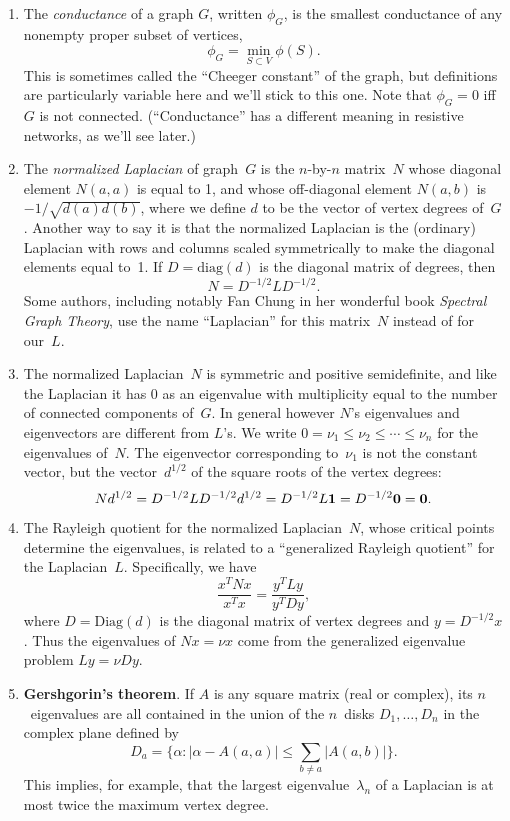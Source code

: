 \documentclass[11pt]{article}
\newcommand{\m}[1]{{\bf{#1}}}       %
\newcommand{\ones}{\m1}             %
\newcommand{\zeros}{\m0}            %
\newcommand{\diag}{\mbox{diag}}
\newcommand{\Diag}{\mbox{Diag}}
\begin{document}
\begin{enumerate}
\item
The {\em conductance} of a graph $G$,
written $\phi_G$, is the smallest conductance of any nonempty 
proper subset of vertices,
$$\phi_G = \min_{S\subset V}\phi(S).$$
This is sometimes called the ``Cheeger constant''
of the graph, but definitions are particularly
variable here and we'll stick to this one.
Note that $\phi_G=0$ iff $G$ is not connected.
(``Conductance'' has a different meaning in resistive networks, as we'll see later.)

\item\label{nlap}
The {\em normalized Laplacian} of graph~$G$ is 
the $n$-by-$n$ matrix~$N$
whose diagonal element $N(a,a)$ is equal to 1,
and whose off-diagonal element $N(a,b)$ 
is~$-1/\sqrt{d(a)d(b)}$, 
where we define $d$ to be the vector of vertex degrees of~$G$.
Another way to say it is that the normalized Laplacian is 
the (ordinary) Laplacian with rows and columns scaled symmetrically 
to make the diagonal elements equal to~1. 
If $D=\diag(d)$ is the diagonal matrix of degrees, 
then 
$$N = D^{-1/2}LD^{-1/2}.$$
Some authors, including notably Fan Chung in her 
wonderful book {\em Spectral Graph Theory}, 
use the name ``Laplacian'' for this matrix~$N$
instead of for our~$L$.

\item\label{nlapeig}
The normalized Laplacian~$N$ is symmetric and 
positive semidefinite, and like the Laplacian
it has 0 as an eigenvalue with multiplicity
equal to the number of connected components
of~$G$.  In general however $N$'s eigenvalues
and eigenvectors are different from $L$'s.
We write $0=\nu_1\le\nu_2\le\cdots\le\nu_n$
for the eigenvalues of~$N$.
The eigenvector corresponding to~$\nu_1$ is
not the constant vector, but the vector~$d^{1/2}$
of the square roots of the vertex degrees:
$$Nd^{1/2} = D^{-1/2}LD^{-1/2}d^{1/2} = D^{-1/2}L\ones = D^{-1/2}\zeros = \zeros.$$

\item\label{nlaprq}
The Rayleigh quotient for the normalized Laplacian~$N$, 
whose critical points determine the eigenvalues,
is related to a ``generalized Rayleigh quotient'' for the Laplacian~$L$.
Specifically, we have
$$\frac{x^TNx}{x^Tx} = \frac{y^TLy}{y^TDy},$$
where $D=\Diag(d)$ is the diagonal matrix of vertex degrees 
and $y=D^{-1/2}x$.
Thus the eigenvalues of $Nx=\nu x$ come from
the generalized eigenvalue problem $Ly=\nu Dy.$

\item\label{gershgorin}{\bf Gershgorin's theorem}.
If $A$ is any square matrix (real or complex), its $n$~eigenvalues are all contained
in the union of the $n$~disks $D_1,\ldots,D_n$ in the complex plane defined by
$$D_a = \{\alpha : |\alpha-A(a,a)| \leq \sum_{b\neq a}|A(a,b)|\}.$$
This implies, for example, that the largest eigenvalue~$\lambda_n$ of a Laplacian
is at most twice the maximum vertex degree.


\end{enumerate}
\end{document}
